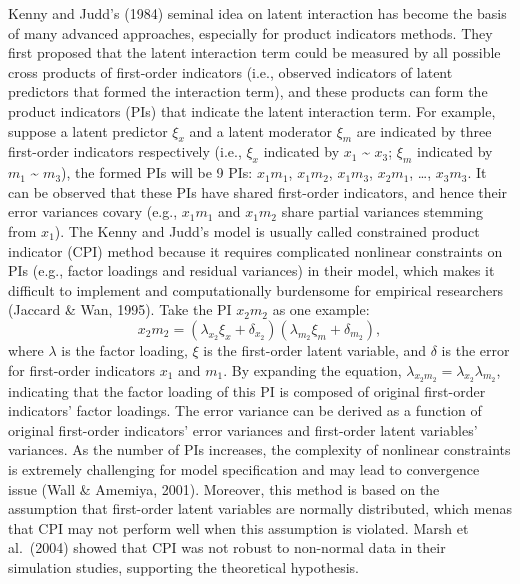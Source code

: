 \documentclass[
  man]{apa7}
\begin{document}
Kenny and Judd's (1984) seminal idea on latent interaction has become the basis of many advanced approaches, especially for product indicators methods. They first proposed that the latent interaction term could be measured by all possible cross products of first-order indicators (i.e., observed indicators of latent predictors that formed the interaction term), and these products can form the product indicators (PIs) that indicate the latent interaction term. For example, suppose a latent predictor \(\xi_{x}\) and a latent moderator \(\xi_{m}\) are indicated by three first-order indicators respectively (i.e., \(\xi_{x}\) indicated by \(x_{1}\) \textasciitilde{} \(x_{3}\); \(\xi_{m}\) indicated by \(m_{1}\) \textasciitilde{} \(m_{3}\)), the formed PIs will be 9 PIs: \(x_{1}m_{1}\), \(x_{1}m_{2}\), \(x_{1}m_{3}\), \(x_{2}m_{1}\), \ldots, \(x_{3}m_{3}\). It can be observed that these PIs have shared first-order indicators, and hence their error variances covary (e.g., \(x_{1}m_{1}\) and \(x_{1}m_{2}\) share partial variances stemming from \(x_{1}\)). The Kenny and Judd's model is usually called constrained product indicator (CPI) method because it requires complicated nonlinear constraints on PIs (e.g., factor loadings and residual variances) in their model, which makes it difficult to implement and computationally burdensome for empirical researchers (Jaccard \& Wan, 1995). Take the PI \(x_{2}m_{2}\) as one example:
\begin{equation}
x_{2}m_{2}= (\lambda_{x_{2}}\xi_{x} + \delta_{x_{2}})(\lambda_{m_{2}}\xi_{m} + \delta_{m_{2}}),
\end{equation}
where \(\lambda\) is the factor loading, \(\xi\) is the first-order latent variable, and \(\delta\) is the error for first-order indicators \(x_{1}\) and \(m_{1}\). By expanding the equation, \(\lambda_{x_{2}m_{2}} = \lambda_{x_{2}}\lambda_{m_{2}}\), indicating that the factor loading of this PI is composed of original first-order indicators' factor loadings. The error variance can be derived as a function of original first-order indicators' error variances and first-order latent variables' variances. As the number of PIs increases, the complexity of nonlinear constraints is extremely challenging for model specification and may lead to convergence issue (Wall \& Amemiya, 2001). Moreover, this method is based on the assumption that first-order latent variables are normally distributed, which menas that CPI may not perform well when this assumption is violated. Marsh et al.~(2004) showed that CPI was not robust to non-normal data in their simulation studies, supporting the theoretical hypothesis.
\end{document}
